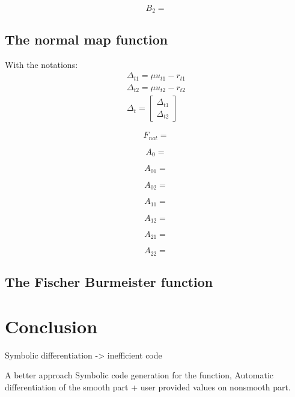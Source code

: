 \documentclass[a4paper]{article}
\begin{document}
\begin{equation}
  B_2 = 
\end{equation}

\subsection{The normal map function}

With the notations:
\begin{equation}
  \begin{array}{c}
    \Delta_{t1} = \mu u_{t1}-r_{t1}\\
    \Delta_{t2} = \mu u_{t2}-r_{t2}\\
    \Delta_{t} = \left [
      \begin{array}{c}
        \Delta_{t1}\\
        \Delta_{t2}
      \end{array} \right]
  \end{array}
\end{equation}

\begin{equation}
  F_{nat} = 
\end{equation}

\begin{equation}
  A_0 = 
\end{equation}

\begin{equation}
  A_{01} = 
\end{equation}

\begin{equation}
  A_{02} = 
\end{equation}

\begin{equation}
  A_{11} = 
\end{equation}

\begin{equation}
  A_{12} = 
\end{equation}

\begin{equation}
  A_{21} = 
\end{equation}

\begin{equation}
  A_{22} = 
\end{equation}

\subsection{The Fischer Burmeister function}

\section{Conclusion}

Symbolic differentiation -> inefficient code

A better approach Symbolic code generation for the function, Automatic
differentiation of the smooth part + user provided values on nonsmooth part.





\end{document}

